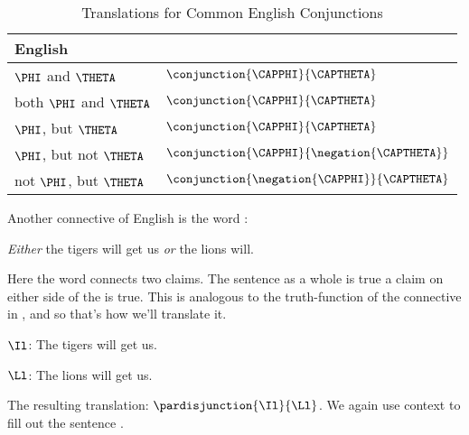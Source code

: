 \begin{table}
	\renewcommand{\arraystretch}{1.5}%
	\begin{center}
		\begin{tabular}{ l l } %
			\toprule
			\textbf{English} & \textbf{\GSL{}} \\ 
			\midrule
			$\PHI$ and $\THETA$ & $\conjunction{\CAPPHI}{\CAPTHETA}$ \\
			both $\PHI$ and $\THETA$ & $\conjunction{\CAPPHI}{\CAPTHETA}$ \\
			$\PHI$, but $\THETA$ & $\conjunction{\CAPPHI}{\CAPTHETA}$ \\
			$\PHI$, but not $\THETA$ & $\conjunction{\CAPPHI}{\negation{\CAPTHETA}}$ \\
			not $\PHI$, but $\THETA$ & $\conjunction{\negation{\CAPPHI}}{\CAPTHETA}$ \\
			\bottomrule
		\end{tabular} 
		\caption{Translations for Common English Conjunctions}
		\label{TransTableD} 
	\end{center}
\end{table}

Another connective of English is the word :

\begin{menumerate}
	\item \emph{Either} the tigers will get us \emph{or} the lions will.
\end{menumerate}

\noindent{}Here the word  connects two claims.  The sentence as a whole is true \Iff a claim on either side of the  is true.  This is analogous to the truth-function of the \mention{$\VEE$} connective in \GSL{}, and so that's how we'll translate it.

	\begin{description}[itemsep=0em]
		\item[Translation Key:] \hfill{} 
		\begin{description}[itemsep=0em]
			\item $\Il$: The tigers will get us.
			\item $\Ll$: The lions will get us.
		\end{description} 
	\end{description}

\noindent{}The resulting translation: $\pardisjunction{\Il}{\Ll}$.  We again use context to fill out the sentence .  

